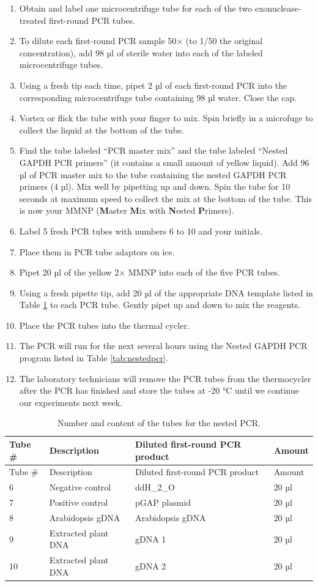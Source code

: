 \documentclass[]{book}
\providecommand{\tightlist}{%
  \setlength{\itemsep}{0pt}\setlength{\parskip}{0pt}}
\begin{document}
\begin{enumerate}
\def\labelenumi{\arabic{enumi}.}
\tightlist
\item
  Obtain and label one microcentrifuge tube for each of the two exonuclease-treated first-round PCR tubes.
\item
  To dilute each first-round PCR sample 50× (to 1/50 the original concentration), add 98 µl of sterile water into each of the labeled microcentrifuge tubes.
\item
  Using a fresh tip each time, pipet 2 µl of each first-round PCR into the corresponding microcentrifuge tube containing 98 µl water. Close the cap.
\item
  Vortex or flick the tube with your finger to mix. Spin briefly in a microfuge to collect the liquid at the bottom of the tube.
\item
  Find the tube labeled ``PCR master mix'' and the tube labeled ``Nested GAPDH PCR primers'' (it contains a small amount of yellow liquid). Add 96 µl of PCR master mix to the tube containing the nested GAPDH PCR primers (4 µl). Mix well by pipetting up and down. Spin the tube for 10 seconds at maximum speed to collect the mix at the bottom of the tube. This is now your MMNP (\textbf{M}aster \textbf{M}ix with \textbf{N}ested \textbf{P}rimers).
\item
  Label 5 fresh PCR tubes with numbers 6 to 10 and your initials.
\item
  Place them in PCR tube adaptors on ice.
\item
  Pipet 20 µl of the yellow 2× MMNP into each of the five PCR tubes.
\item
  Using a fresh pipette tip, add 20 µl of the appropriate DNA template listed in Table \ref{tab:nestedtubes} to each PCR tube. Gently pipet up and down to mix the reagents.
\item
  Place the PCR tubes into the thermal cycler.
\item
  The PCR will run for the next several hours using the Nested GAPDH PCR program listed in Table \ref{tab:nestedpcr}.
\item
  The laboratory technicians will remove the PCR tubes from the thermocycler after the PCR has finished and store the tubes at -20 °C until we continue our experiments next week.
\end{enumerate}

\begin{longtable}[]{@{}llll@{}}
\caption{\label{tab:nestedtubes} Number and content of the tubes for the nested PCR.}\tabularnewline
\toprule
Tube \# & Description & Diluted first-round PCR product & Amount\tabularnewline
\midrule
\endfirsthead
\toprule
Tube \# & Description & Diluted first-round PCR product & Amount\tabularnewline
\midrule
\endhead
6 & Negative control & ddH\_2\_O & 20 µl\tabularnewline
7 & Positive control & pGAP plasmid & 20 µl\tabularnewline
8 & Arabidopsis gDNA & Arabidopsis gDNA & 20 µl\tabularnewline
9 & Extracted plant DNA & gDNA 1 & 20 µl\tabularnewline
10 & Extracted plant DNA & gDNA 2 & 20 µl\tabularnewline
\bottomrule
\end{longtable}
\end{document}
